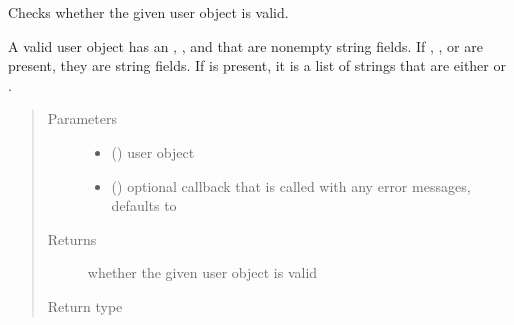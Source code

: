 \documentclass[letterpaper,10pt,english]{sphinxmanual}
\begin{document}
\begin{fulllineitems}
\label{\detokenize{autoapi/pine/client/models/index:pine.client.models.is_valid_eve_user}}
Checks whether the given user object is valid.

A valid user object has an , , and  that are non\sphinxhyphen{}empty string
fields.  If , , or  are present, they are string fields.
If  is present, it is a list of strings that are either  or .
\begin{quote}\begin{description}
\item[{Parameters}] \leavevmode\begin{itemize}
\item {} 
 () \textendash{} user object

\item {} 
 (\sphinxstyleliteralemphasis{\sphinxupquote{, }}) \textendash{} optional callback that is called with any error messages, defaults to 

\end{itemize}

\item[{Returns}] \leavevmode
whether the given user object is valid

\item[{Return type}] \leavevmode
{}

\end{description}\end{quote}

\end{fulllineitems}
\end{document}

